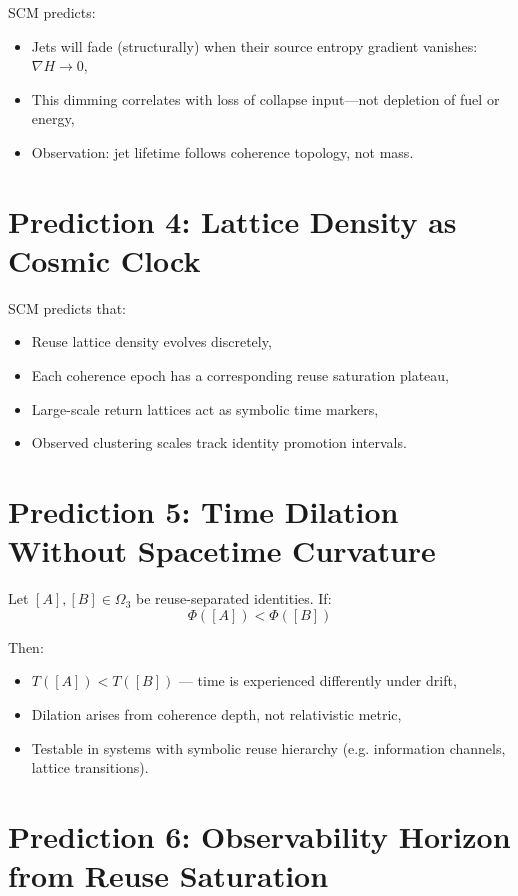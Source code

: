 SCM predicts:
\begin{itemize}
  \item Jets will fade (structurally) when their source entropy gradient vanishes: $\nabla H \to 0$,
  \item This dimming correlates with loss of collapse input—not depletion of fuel or energy,
  \item Observation: jet lifetime follows coherence topology, not mass.
\end{itemize}

\section{Prediction 4: Lattice Density as Cosmic Clock} \label{sec:lattice-clock}

SCM predicts that:
\begin{itemize}
  \item Reuse lattice density evolves discretely,
  \item Each coherence epoch has a corresponding reuse saturation plateau,
  \item Large-scale return lattices act as symbolic time markers,
  \item Observed clustering scales track identity promotion intervals.
\end{itemize}

\section{Prediction 5: Time Dilation Without Spacetime Curvature} \label{sec:nonrel-time-dilation}

Let $[A], [B] \in \Omega_3$ be reuse-separated identities. If:
\[
\Phi([A]) < \Phi([B])
\]

Then:
\begin{itemize}
  \item $T([A]) < T([B])$ — time is experienced differently under drift,
  \item Dilation arises from coherence depth, not relativistic metric,
  \item Testable in systems with symbolic reuse hierarchy (e.g. information channels, lattice transitions).
\end{itemize}

\section{Prediction 6: Observability Horizon from Reuse Saturation} \label{sec:reuse-horizon}

